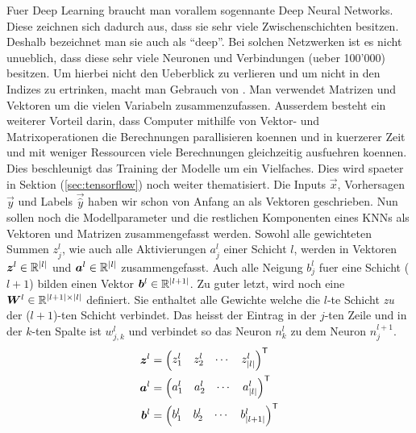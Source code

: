 \par\bigskip
Fuer Deep Learning braucht man vorallem sogennante Deep Neural Networks. Diese
zeichnen sich dadurch aus, dass sie sehr viele Zwischenschichten besitzen.
Deshalb bezeichnet man sie auch als ``deep''.
Bei solchen Netzwerken ist es nicht unueblich,
dass diese sehr viele Neuronen und Verbindungen (ueber 100'000) besitzen.
Um hierbei nicht den Ueberblick zu verlieren und um nicht in den Indizes zu
ertrinken, macht man Gebrauch von . Man verwendet
Matrizen und Vektoren um die vielen Variabeln zusammenzufassen.
Ausserdem besteht ein weiterer Vorteil darin, dass Computer mithilfe von Vektor-
und Matrixoperationen die Berechnungen parallisieren koennen und in kuerzerer
Zeit und mit weniger Ressourcen viele Berechnungen gleichzeitig ausfuehren koennen.
Dies beschleunigt das Training der Modelle um
ein Vielfaches. Dies wird spaeter in Sektion
(\ref{sec:tensorflow}) noch weiter thematisiert.
\para{}
Die Inputs $\vec{x}$, Vorhersagen $\vec{y}$ und Labels $\vec{\hat{y}}$ haben wir schon von Anfang an als Vektoren geschrieben.
Nun sollen noch die Modellparameter und die restlichen Komponenten eines KNNs als Vektoren und Matrizen zusammengefasst werden.
Sowohl alle gewichteten Summen $z_j^l$, wie auch alle Aktivierungen $a_j^l$
einer Schicht $l$, werden in Vektoren $\bm{z}^l \in \mathbb{R}^{|l|}$ und
$\bm{a}^l \in \mathbb{R}^{|l|}$ zusammengefasst.
Auch alle Neigung $b_j^l$ fuer eine Schicht ($l+1$) bilden einen Vektor
$\bm{b}^l \in \mathbb{R}^{|l+1|}$.
\para{}
Zu guter letzt, wird noch eine  $\bm{W}^l \in
\mathbb{R}^{|l+1| \times |l|}$
definiert. Sie enthaltet alle Gewichte welche die $l$-te
Schicht \textit{zu} der ($l+1$)-ten Schicht verbindet.
Das heisst der Eintrag in der $j$-ten Zeile und in
der $k$-ten Spalte ist $w_{j,k}^l$ und verbindet so das Neuron $n_k^{l}$ zu
dem Neuron $n_j^{l+1}$.
\\
\begin{align*}
  \bm{z}^l &=  \begin{pmatrix} z_1^l & z_2^l & \cdots & z_{|l|}^l \end{pmatrix}^{\mathsf{T}} \\
  \bm{a}^l &=  \begin{pmatrix} a_1^l & a_2^l & \cdots & a_{|l|}^l \end{pmatrix}^{\mathsf{T}} \\
  \bm{b}^l &=  \begin{pmatrix} b_1^l & b_2^l & \cdots & b_{|l+1|}^l \end{pmatrix}^{\mathsf{T}} \\
\end{align*}
